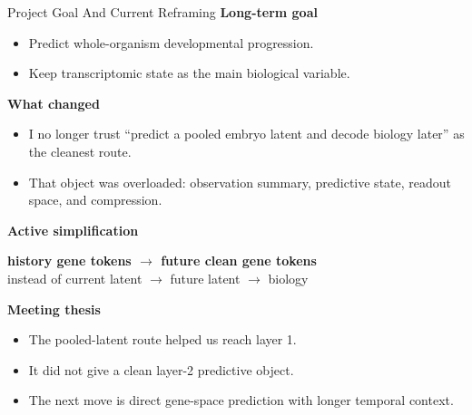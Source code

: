 \documentclass[aspectratio=169,11pt]{beamer}
\begin{document}
\begin{frame}[shrink=5]{Project Goal And Current Reframing}
\textbf{Long-term goal}
\begin{itemize}
    \item Predict whole-organism developmental progression.
    \item Keep transcriptomic state as the main biological variable.
\end{itemize}

\vspace{0.5em}
\textbf{What changed}
\begin{itemize}
    \item I no longer trust ``predict a pooled embryo latent and decode biology later'' as the cleanest route.
    \item That object was overloaded:
    observation summary, predictive state, readout space, and compression.
\end{itemize}

\vspace{0.3em}
\textbf{Active simplification}
\begin{center}
\small
\textbf{history gene tokens $\rightarrow$ future clean gene tokens}\\
instead of current latent $\rightarrow$ future latent $\rightarrow$ biology
\end{center}

\vspace{0.3em}
\textbf{Meeting thesis}
\begin{itemize}
    \item The pooled-latent route helped us reach layer 1.
    \item It did not give a clean layer-2 predictive object.
    \item The next move is direct gene-space prediction with longer temporal context.
\end{itemize}
\end{frame}
\end{document}
